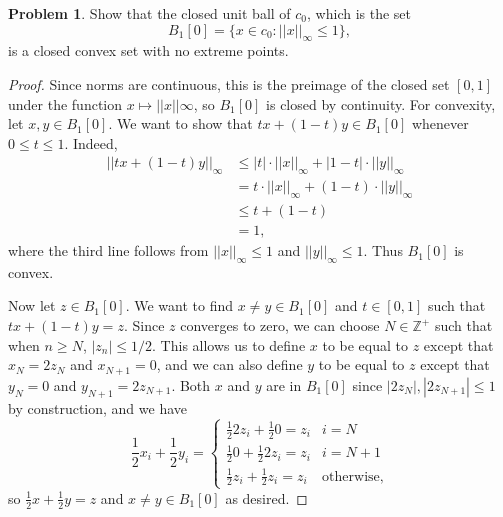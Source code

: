 \documentclass[12pt]{article}
\theoremstyle{definition}
\newtheorem{ex}{Problem}
\begin{document}
\begin{ex}
	Show that the closed unit ball of $c_0$, which is the set \begin{equation*}
		B_1[0] = \lbrace x \in c_0 : ||x||_\infty \leq 1 \rbrace,
	\end{equation*}
	is a closed convex set with no extreme points.
\end{ex}
\begin{proof}
    Since norms are continuous, this is the preimage of the closed set $[0, 1]$ under the function $x \mapsto ||x||\infty$, so $B_1[0]$ is closed by continuity.
    For convexity, let $x, y \in B_1[0]$.
    We want to show that $tx + (1-t)y \in B_1[0]$ whenever $0 \leq t \leq 1$.
    Indeed, \begin{align*}
        ||tx + (1-t)y||_\infty & \leq |t| \cdot ||x||_\infty + |1-t| \cdot ||y||_\infty \\
                               & = t \cdot ||x||_\infty + (1-t) \cdot ||y||_\infty \\
                               & \leq t + (1-t) \\
                               & = 1,
    \end{align*}
    where the third line follows from $||x||_\infty \leq 1$ and $||y||_\infty \leq 1$.
    Thus $B_1[0]$ is convex.

    Now let $z \in B_1[0]$.
    We want to find $x \neq y \in B_1[0]$ and $t \in [0, 1]$ such that $tx + (1-t)y = z$.
    Since $z$ converges to zero, we can choose $N \in \mathbb{Z}^+$ such that when $n \geq N$, $|z_n| \leq 1/2$.
    This allows us to define $x$ to be equal to $z$ except that $x_N = 2z_N$ and $x_{N+1} = 0$, and we can also define $y$ to be equal to $z$ except that $y_N = 0$ and $y_{N+1} = 2z_{N+1}$.
    Both $x$ and $y$ are in $B_1[0]$ since $|2z_N|, |2z_{N+1}|  \leq 1$ by construction, and we have \begin{equation*}
        \frac{1}{2}x_i + \frac{1}{2}y_i = \begin{cases}
            \frac{1}{2} 2z_i + \frac{1}{2} 0 = z_i & i = N \\
            \frac{1}{2} 0 + \frac{1}{2} 2z_i = z_i & i = N + 1 \\
            \frac{1}{2} z_i + \frac{1}{2} z_i = z_i & \text{otherwise},
        \end{cases}
    \end{equation*}
    so $\frac{1}{2}x + \frac{1}{2}y = z$ and $x \neq y \in B_1[0]$ as desired.
\end{proof}
\end{document}
